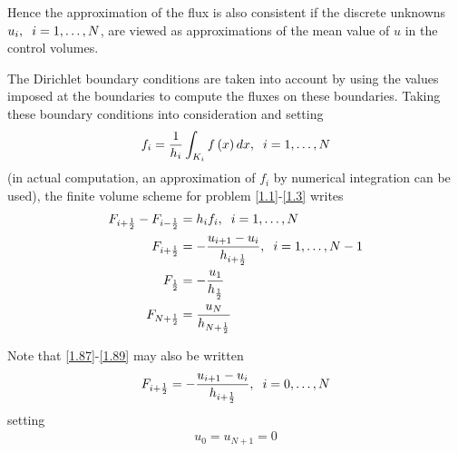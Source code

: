 \documentclass[a4paper]{article}
\numberwithin{equation}{section}
\begin{document}
Hence the approximation of the flux is also consistent if the discrete unknowns $u_i,\hspace{0.2cm}i=1,\ldots,N$, are viewed as approximations of the mean value of $u$ in the control volumes.

The Dirichlet boundary conditions are taken into account by using the values imposed at the boundaries to compute the fluxes on these boundaries. Taking these boundary conditions into consideration and setting 
\begin{align}
{f_i} = \frac{1}{{{h_i}}}\int_{{K_i}} {f\left( x \right)dx} ,\hspace{0.2cm} i = 1, \ldots ,N
\end{align}
(in actual computation, an approximation of $f_i$ by numerical integration can be used), the finite volume scheme for problem \eqref{1.1}-\eqref{1.3} writes
\begin{align}
\label{1.86}
{F_{i + \frac{1}{2}}} - {F_{i - \frac{1}{2}}} &= {h_i}{f_i},\hspace{0.2cm}i = 1, \ldots ,N\\
{F_{i + \frac{1}{2}}} &=  - \frac{{{u_{i + 1}} - {u_i}}}{{{h_{i + \frac{1}{2}}}}},\hspace{0.2cm}i = 1, \ldots ,N - 1\label{1.87}\\
{F_{\frac{1}{2}}} &=  - \frac{{{u_1}}}{{{h_{\frac{1}{2}}}}}\label{1.88}\\
{F_{N + \frac{1}{2}}} &= \frac{{{u_N}}}{{{h_{N + \frac{1}{2}}}}} \label{1.89}
\end{align}

Note that \eqref{1.87}-\eqref{1.89} may also be written
\begin{align}
{F_{i + \frac{1}{2}}} =  - \frac{{{u_{i + 1}} - {u_i}}}{{{h_{i + \frac{1}{2}}}}},\hspace{0.2cm}i = 0, \ldots ,N
\end{align}
setting
\begin{align}
\label{1.91}
{u_0} = {u_{N + 1}} = 0
\end{align}
\end{document}
